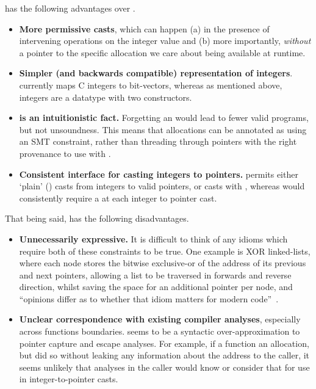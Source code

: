  has the following advantages over .
\begin{itemize}
    \item \textbf{More permissive  casts}, which can happen (a) in
        the presence of intervening operations on the integer value and (b)
        more importantly, \emph{without} a pointer to the specific allocation
        we care about being available at runtime.
    \item \textbf{Simpler (and backwards compatible) representation of
        integers}.  currently maps C integers to bit-vectors, whereas
        as mentioned above,  integers are a datatype with two
        constructors.
    \item \textbf{ is an intuitionistic fact.} Forgetting an
         would lead to fewer valid programs, but not unsoundness.
        This means that allocations can be annotated as  using an
        SMT constraint, rather than threading through pointers with the right
        provenance to use with .
    \item \textbf{Consistent interface for casting integers to pointers.}
         permits either `plain' () casts from integers to
        valid pointers, or casts with , whereas
         would consistently require a 
        at each integer to pointer cast.
\end{itemize}

That being said,  has the following disadvantages.
\begin{itemize}
    \item \textbf{Unnecessarily expressive.} It is difficult to think of any
        idioms which require both of these constraints to be true. One example
        is XOR linked-lists, where each node stores the bitwise exclusive-or of
        the address of its previous and next pointers, allowing a list to be
        traversed in forwards and reverse direction, whilst saving the space
        for an additional pointer per node, and ``opinions differ as to whether
        that idiom matters for modern code''~.
    \item \textbf{Unclear correspondence with existing compiler analyses},
        especially across functions boundaries.  seems to
        be a syntactic over-approximation to pointer capture and escape
        analyses.
        For example, if a function  an allocation, but did so
        without leaking any information about the  address to the
        caller, it seems unlikely that analyses in the caller would know or
        consider that  for use in integer-to-pointer casts.
\end{itemize}

